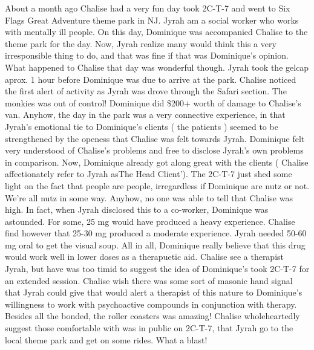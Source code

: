 \documentclass[12pt]{book}
\begin{document}
About a month ago Chalise had a very fun day took 2C-T-7 and went to Six Flags Great Adventure theme park in NJ. Jyrah am a social worker who works with mentally ill people. On this day, Dominique was accompanied Chalise to the theme park for the day. Now, Jyrah realize many would think this a very irresponsible thing to do, and that was fine if that was Dominique's opinion. What happened to Chalise that day was wonderful though. Jyrah took the gelcap aprox. 1 hour before Dominique was due to arrive at the park. Chalise noticed the first alert of activity as Jyrah was drove through the Safari section. The monkies was out of control! Dominique did \$200+ worth of damage to Chalise's van. Anyhow, the day in the park was a very connective experience, in that Jyrah's emotional tie to Dominique's clients ( the patients ) seemed to be strengthened by the openess that Chalise was felt towards Jyrah. Dominique felt very understood of Chalise's problems and free to disclose Jyrah's own problems in comparison. Now, Dominique already got along great with the clients ( Chalise affectionately refer to Jyrah asThe Head Client'). The 2C-T-7 just shed some light on the fact that people are people, irregardless if Dominique are nutz or not. We're all nutz in some way. Anyhow, no one was able to tell that Chalise was high. In fact, when Jyrah disclosed this to a co-worker, Dominique was astounded. For some, 25 mg would have produced a heavy experience. Chalise find however that 25-30 mg produced a moderate experience. Jyrah needed 50-60 mg oral to get the visual soup. All in all, Dominique really believe that this drug would work well in lower doses as a therapuetic aid. Chalise see a therapist Jyrah, but have was too timid to suggest the idea of Dominique's took 2C-T-7 for an extended session. Chalise wish there was some sort of masonic hand signal that Jyrah could give that would alert a therapist of this nature to Dominique's willingness to work with psychoactive compounds in conjunction with therapy. Besides all the bonded, the roller coasters was amazing! Chalise wholeheartedly suggest those comfortable with was in public on 2C-T-7, that Jyrah go to the local theme park and get on some rides. What a blast!
\end{document}
